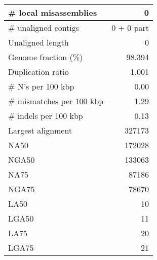 \documentclass[12pt,a4paper]{article}
\begin{document}
\begin{table}[ht]
\begin{center}
\begin{tabular}{|l*{1}{|r}|}
\# local misassemblies & 0 \\ \hline
\# unaligned contigs & 0 + 0 part \\ \hline
Unaligned length & 0 \\ \hline
Genome fraction (\%) & 98.394 \\ \hline
Duplication ratio & 1.001 \\ \hline
\# N's per 100 kbp & 0.00 \\ \hline
\# mismatches per 100 kbp & 1.29 \\ \hline
\# indels per 100 kbp & 0.13 \\ \hline
Largest alignment & 327173 \\ \hline
NA50 & 172028 \\ \hline
NGA50 & 133063 \\ \hline
NA75 & 87186 \\ \hline
NGA75 & 78670 \\ \hline
LA50 & 10 \\ \hline
LGA50 & 11 \\ \hline
LA75 & 20 \\ \hline
LGA75 & 21 \\ \hline
\end{tabular}
\end{center}
\end{table}
\end{document}
